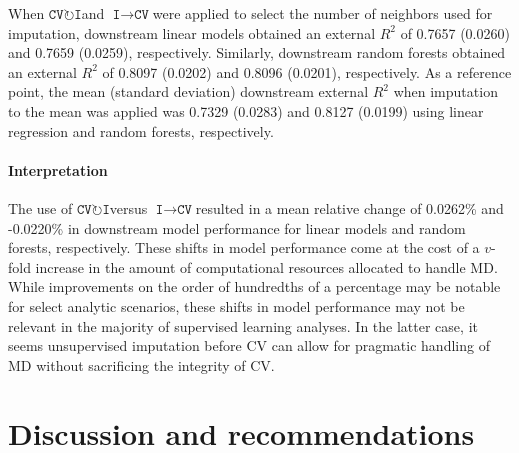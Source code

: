 \documentclass[AMA,STIX1COL,doublespace]{WileyNJD-v2}
\begin{document}
When $\texttt{CV}\!\circlearrowright\!\texttt{I}$\space and
$\texttt{I}\!\!\rightarrow\!\texttt{CV}$\space were applied to select
the number of neighbors used for imputation, downstream linear models
obtained an external \(R^2\) of 0.7657 (0.0260) and 0.7659 (0.0259),
respectively. Similarly, downstream random forests obtained an external
\(R^2\) of 0.8097 (0.0202) and 0.8096 (0.0201), respectively. As a
reference point, the mean (standard deviation) downstream external
\(R^2\) when imputation to the mean was applied was 0.7329 (0.0283) and
0.8127 (0.0199) using linear regression and random forests,
respectively.

\paragraph{Interpretation}

The use of $\texttt{CV}\!\circlearrowright\!\texttt{I}$\space versus
$\texttt{I}\!\!\rightarrow\!\texttt{CV}$\space resulted in a mean
relative change of 0.0262\% and -0.0220\% in downstream model
performance for linear models and random forests, respectively. These
shifts in model performance come at the cost of a \(v\)-fold increase in
the amount of computational resources allocated to handle MD. While
improvements on the order of hundredths of a percentage may be notable
for select analytic scenarios, these shifts in model performance may not
be relevant in the majority of supervised learning analyses. In the
latter case, it seems unsupervised imputation before CV can allow for
pragmatic handling of MD without sacrificing the integrity of CV.

\section{Discussion and recommendations} \label{sec:discuss}
\end{document}

